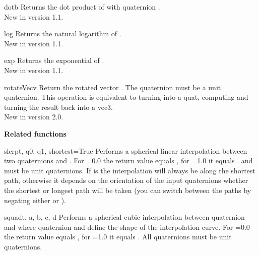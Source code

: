 \begin{methoddesc}{dot}{b}
Returns the dot product of  with quaternion .\\
New in version 1.1.
\end{methoddesc}

\begin{methoddesc}{log}{}
Returns the natural logarithm of .\\
New in version 1.1.
\end{methoddesc}

\begin{methoddesc}{exp}{}
Returns the exponential of . \\
New in version 1.1.
\end{methoddesc}

\begin{methoddesc}{rotateVec}{v}
Return the rotated vector . The quaternion must be a unit quaternion.
This operation is equivalent to turning  into a quat, computing
 and turning the result back into a vec3.\\
New in version 2.0.
\end{methoddesc}

{\bf Related functions}

\begin{funcdesc}{slerp}{t, q0, q1, shortest=True}
Performs a spherical linear interpolation between two quaternions 
and . For =0.0 the return value equals , for 
=1.0 it equals .  and  must be unit 
quaternions. If  is  the interpolation will always
be along the shortest path, otherwise it depends on the orientation of
the input quaternions whether the shortest or longest path will be taken
(you can switch between the paths by negating either  or ).
\end{funcdesc}

\begin{funcdesc}{squad}{t, a, b, c, d}
Performs a spherical cubic interpolation between quaternion  and 
where quaternion  and  define the shape of the interpolation
curve. For =0.0 the return value equals , for =1.0 it 
equals . All quaternions must be unit quaternions.
\end{funcdesc}




